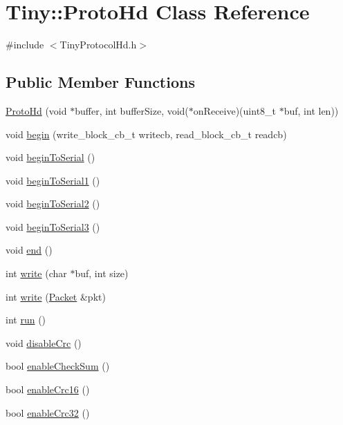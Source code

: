 \hypertarget{classTiny_1_1ProtoHd}{}\section{Tiny\+:\+:Proto\+Hd Class Reference}
\label{classTiny_1_1ProtoHd}


{\ttfamily \#include $<$Tiny\+Protocol\+Hd.\+h$>$}

\subsection*{Public Member Functions}
\begin{DoxyCompactItemize}
\item 
\hyperlink{classTiny_1_1ProtoHd_a1a55191980c259f2c760997d9c07cb48}{Proto\+Hd} (void $\ast$buffer, int buffer\+Size, void($\ast$on\+Receive)(uint8\+\_\+t $\ast$buf, int len))
\item 
void \hyperlink{classTiny_1_1ProtoHd_a112ae02531837a852af7ca3c9a32a7eb}{begin} (write\+\_\+block\+\_\+cb\+\_\+t writecb, read\+\_\+block\+\_\+cb\+\_\+t readcb)
\item 
void \hyperlink{classTiny_1_1ProtoHd_a0e88ac5b3c67ca67c566742c22180050}{begin\+To\+Serial} ()
\item 
void \hyperlink{classTiny_1_1ProtoHd_a1b2975217b0523c3de4b534644cfa501}{begin\+To\+Serial1} ()
\item 
void \hyperlink{classTiny_1_1ProtoHd_a450fc792e515ffd150072988bc632c9e}{begin\+To\+Serial2} ()
\item 
void \hyperlink{classTiny_1_1ProtoHd_acd6519f6652c279b3a3b98aabbaeed65}{begin\+To\+Serial3} ()
\item 
void \hyperlink{classTiny_1_1ProtoHd_ac87bf8264895b654025001a0e6014f3f}{end} ()
\item 
int \hyperlink{classTiny_1_1ProtoHd_af53c8817317d3a62535e68ca236a038f}{write} (char $\ast$buf, int size)
\item 
int \hyperlink{classTiny_1_1ProtoHd_abffb26e95006c4e09e79f27f6ec4cdfe}{write} (\hyperlink{classTiny_1_1Packet}{Packet} \&pkt)
\item 
int \hyperlink{classTiny_1_1ProtoHd_af07b1f5d0df3021e00a4b4f04af4150b}{run} ()
\item 
void \hyperlink{classTiny_1_1ProtoHd_ae90a0a40de0b71a015f7f7f940440fa0}{disable\+Crc} ()
\item 
bool \hyperlink{classTiny_1_1ProtoHd_ace4e6b993532b3eb47d025b8db94192d}{enable\+Check\+Sum} ()
\item 
bool \hyperlink{classTiny_1_1ProtoHd_a0887adedc93b7538dbaef3fc8e0b2819}{enable\+Crc16} ()
\item 
bool \hyperlink{classTiny_1_1ProtoHd_a4110a0112548d5e47d312d190930ad20}{enable\+Crc32} ()
\end{DoxyCompactItemize}


